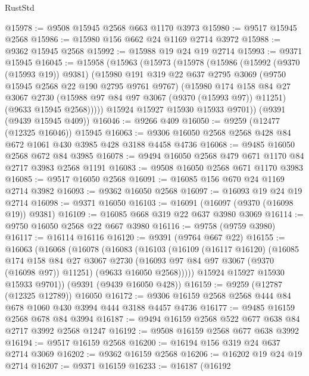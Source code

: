 \begin{lexlean}{RustStd}
\begin{coremodule}
@15978 := @9508 @15945 @2568 @663 @1170 @3973
@15980 := @9517 @15945 @2568
@15986 := @15980 @156 @662 @24 @1169 @2714 @3972
@15988 := @9362 @15945 @2568
@15992 := @15988 @19 @24 @19 @2714
@15993 := @9371 @15945
@16045 := @15958
    (@15963
      (@15973
        (@15978
          (@15986
            (@15992 (@9370 (@15993 @19)) @9381)
            (@15980
              @191
              @319
              @22
              @637
              @2795
              @3069
              (@9750 @15945 @2568 @22 @190 @2795 @9761 @9767)
              (@15980
                @174
                @158
                @84
                @27
                @3067
                @2730
                (@15988 @97 @84 @97 @3067 (@9370 (@15993 @97)) @11251)
                (@9633 @15945 @2568)))))
        @15924
        @15927
        @15930
        @15933
        @9701))
    (@9391 (@9439 @15945 @409))
@16046 := @9266 @409
@16050 := @9259 (@12477 (@12325 @16046)) @15945
@16063 := @9306 @16050 @2568 @2568 @428 @84 @672 @1061 @430 @3985 @428 @3188 @4458 @4736
@16068 := @9485 @16050 @2568 @672 @84 @3985
@16078 := @9494 @16050 @2568 @479 @671 @1170 @84 @2717 @3983 @2568 @1191
@16083 := @9508 @16050 @2568 @671 @1170 @3983
@16085 := @9517 @16050 @2568
@16091 := @16085 @156 @670 @24 @1169 @2714 @3982
@16093 := @9362 @16050 @2568
@16097 := @16093 @19 @24 @19 @2714
@16098 := @9371 @16050
@16103 := @16091 (@16097 (@9370 (@16098 @19)) @9381)
@16109 := @16085 @668 @319 @22 @637 @3980 @3069
@16114 := @9750 @16050 @2568 @22 @667 @3980
@16116 := @9758 (@9759 @3980)
@16117 := @16114 @16116
@16120 := @9391 (@9764 @667 @22)
@16155 := @16063
    (@16068
      (@16078
        (@16083
          (@16103
            (@16109
              (@16117 @16120)
              (@16085
                @174
                @158
                @84
                @27
                @3067
                @2730
                (@16093 @97 @84 @97 @3067 (@9370 (@16098 @97)) @11251)
                (@9633 @16050 @2568)))))
        @15924
        @15927
        @15930
        @15933
        @9701))
    (@9391 (@9439 @16050 @428))
@16159 := @9259 (@12787 (@12325 @12789)) @16050
@16172 := @9306 @16159 @2568 @2568 @444 @84 @678 @1060 @430 @3994 @444 @3188 @4457 @4736
@16177 := @9485 @16159 @2568 @678 @84 @3994
@16187 := @9494 @16159 @2568 @522 @677 @638 @84 @2717 @3992 @2568 @1247
@16192 := @9508 @16159 @2568 @677 @638 @3992
@16194 := @9517 @16159 @2568
@16200 := @16194 @156 @319 @24 @637 @2714 @3069
@16202 := @9362 @16159 @2568
@16206 := @16202 @19 @24 @19 @2714
@16207 := @9371 @16159
@16233 := @16187
    (@16192

\end{coremodule}
\end{lexlean}
